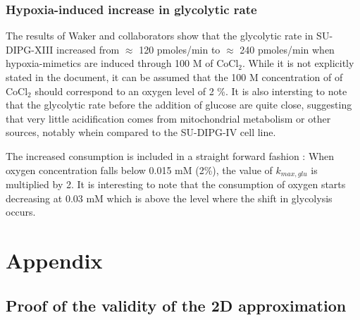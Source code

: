 \documentclass[11pt,a4paper]{article}
\begin{document}
\subsubsection{Hypoxia-induced increase in glycolytic rate}
The results of Waker and collaborators show that the glycolytic rate in SU-DIPG-XIII increased from $\approx$ 120 pmoles/min to $\approx$ 240 pmoles/min when hypoxia-mimetics are induced through 100 \textmu M of CoCl$_2$. While it is not explicitly stated in the document, it can be assumed that the 100 \textmu M concentration of of CoCl$_2$ should correspond to an oxygen level of 2 \%. It is also intersting to note that the glycolytic rate before the addition of glucose are quite close, suggesting that very little acidification comes from mitochondrial metabolism or other sources, notably whein compared to the SU-DIPG-IV cell line.

The increased consumption is included in a straight forward fashion : When oxygen concentration falls below 0.015 mM (2\%), the value of $k_{max,glu}$ is multiplied by 2. It is interesting to note that the consumption of oxygen starts decreasing at 0.03 mM which is above the level where the shift in glycolysis occurs.










\section*{Appendix}
\subsection*{Proof of the validity of the 2D approximation}
\newpage


\end{document}
